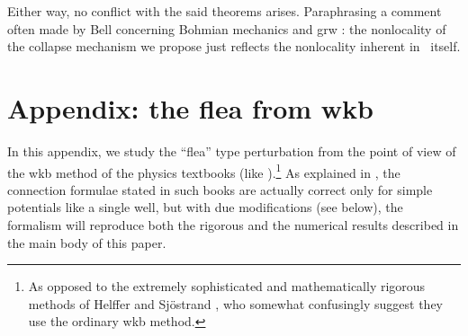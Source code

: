 \documentclass[12pt]{article}
\begin{document}
Either way, no conflict with the said theorems arises. Paraphrasing a comment often made by Bell concerning Bohmian mechanics and {\sc grw} \cite{Maudlin}: the nonlocality of the collapse mechanism we propose just reflects the nonlocality inherent in \qm\ itself. 
\section{Appendix: the flea from  {\sc wkb}}
In this appendix, we study  the ``flea'' type perturbation from the point of view of
 the {\sc wkb} method of the physics textbooks (like \cite{Griffiths,LL}).\footnote{As opposed to the extremely sophisticated and mathematically rigorous methods of Helffer and Sj\"{o}strand \cite{DS,Helffer,HS}, who somewhat confusingly suggest they use the ordinary  {\sc wkb} method.} As explained in \cite{Froman2,Froman}, the  connection formulae stated in such books are actually correct only for simple potentials like a single well, but 
 with due modifications (see below), the formalism  will reproduce both the rigorous and the numerical results described in the main body of this paper.
\end{document}
